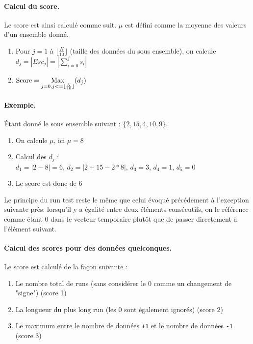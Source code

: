 \paragraph{Calcul du score.\\}
Le score est ainsi calculé comme suit. $\mu$ est défini comme la moyenne des valeurs d'un ensemble donné.
\begin{enumerate}
\item Pour $j=1$ à $ \lfloor\frac{N}{10}\rfloor$ (taille des données du sous ensemble), on calcule $d_j=|Esc_j| = |\sum\limits_{i=0}^{j} s_i|$
\item $\text{Score} = \operatorname*{Max}\limits_{j=0,j<=\lfloor\frac{N}{10}\rfloor} (d_j)$
\end{enumerate}

\paragraph{Exemple.\\}
Étant donné le sous ensemble suivant : $ \lbrace 2, 15, 4, 10, 9 \rbrace$. 
\begin{enumerate}
\item On calcule $\mu$, ici $\mu=8$
\item Calcul des $d_j$ :\\
$d_1=|2-8|=6$, $d_2=|2+15-2*8|$, $d_3=3$, $d_4=1$, $d_5=0$
\item Le score est donc de $6$\\
\end{enumerate}

Le principe du run test reste le même que celui évoqué précédement à l'exception suivante près: lorsqu'il y a égalité entre deux éléments consécutifs, on le référence comme étant 0 dans le vecteur temporaire plutôt que de passer directement à l'élément suivant. 

\paragraph{Calcul des scores pour des données quelconques.\\}
Le score est calculé de la façon suivante : 
\begin{enumerate}
\item Le nombre total de runs (sans considérer le 0 comme un changement de "signe") (score 1)
\item La longueur du plus long run (les 0 sont également ignorés) (score 2)
\item Le maximum entre le nombre de données \texttt{+1} et le nombre de données \texttt{-1} (score 3)\\

\end{enumerate}



